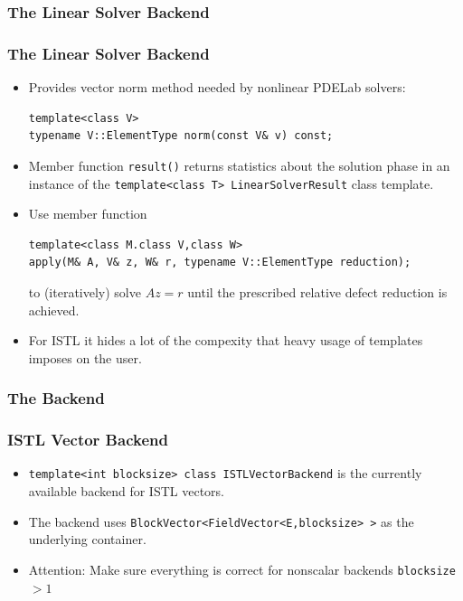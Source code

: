 \subsubsection{The Linear Solver Backend}
\label{sec:line-solv-back}

\begin{frame}[fragile]
  \frametitle<presentation>{The Linear Solver Backend}
  \begin{itemize}
  \item Provides vector norm method needed by nonlinear PDELab solvers:
      \begin{lstlisting}
template<class V>
typename V::ElementType norm(const V& v) const;
      \end{lstlisting}
    \item Member function \lstinline!result()! returns statistics
      about the solution phase in an instance of the
      \lstinline!template<class T> LinearSolverResult! class template.
\item Use member function
  \begin{lstlisting}
template<class M.class V,class W>
apply(M& A, V& z, W& r, typename V::ElementType reduction);
  \end{lstlisting}
  to (iteratively) solve $Az=r$ until the prescribed relative defect
  reduction is achieved.
  \item For ISTL it hides a lot of the compexity that heavy usage of
    templates imposes on the user.
  \end{itemize}
\end{frame}

\subsubsection{The Backend}
\label{sec:backend}

\begin{frame}
  \frametitle{ISTL Vector Backend}
  \begin{itemize}
  \item \lstinline!template<int blocksize> class ISTLVectorBackend!
    is the currently available backend for ISTL vectors.
  \item The backend uses
    \lstinline!BlockVector<FieldVector<E,blocksize> >! as the
    underlying container.
  \item Attention: Make sure everything is correct for nonscalar backends
    \lstinline!blocksize!$>1$
  \end{itemize}
\end{frame}

